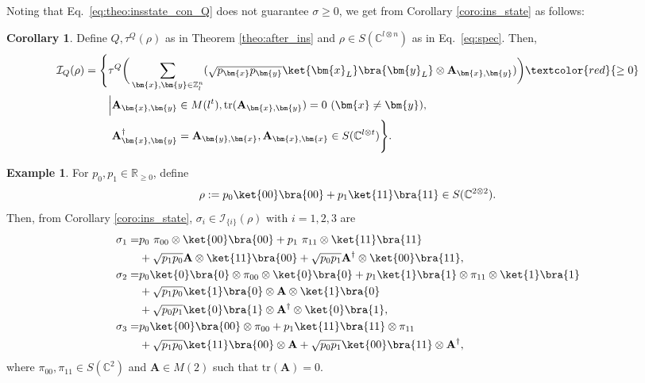 \documentclass[reprint,amsmath,amssymb,aps,]{revtex4-2}
\theoremstyle{definition}
\newtheorem{exam}{Example}
\newtheorem{coro}{Corollary}
\newcommand{\R}[1]{\textcolor{red}{#1}}
\newcommand{\SET}[1]{\mathbb{#1}}
\newcommand{\NNR}{\SET{R}_{\ge 0}}
\newcommand{\Z}{\SET{Z}}
\newcommand{\C}{\SET{C}}
\newcommand{\1}{\mbox{1}\hspace{-0.25em}\mbox{l}}%
\newcommand{\mat}[1]{\mathbf{#1}}
\newcommand{\pure}[2]{\C^{#1 \otimes #2}}
\newcommand{\state}[2]{S(\pure{#1}{#2})}
\newcommand{\QU}[1]{\mathcal{#1}}
\begin{document}
Noting that
Eq.~\eqref{eq:theo:insstate_con_Q} does not guarantee $\sigma \ge 0$,
we get from Corollary \ref{coro:ins_state} as follows:
\begin{coro}
  \label{coro:insset}
  Define $Q, \tau^Q(\rho)$ as in Theorem \ref{theo:after_ins}
  and
  $\rho \in \state{l}{n}$ as in Eq.~\eqref{eq:spec}.
  Then,
  \begin{align*}
    \QU{I}_Q(\rho)
    =
    \Bigg\{
    &\tau^Q
    \bigg(
    \sum_{\bm{x},\bm{y} \in \Z_{l}^{n}}
    (
    \sqrt{ p_{\bm{x}} p_{\bm{y}} }
    \ket{\bm{x}_L}\bra{\bm{y}_L} \otimes \mat{A}_{\bm{x},\bm{y}}
    )
    \bigg)
    \R{ \ge 0 }\\
    &\Big|
    \mat{A}_{\bm{x},\bm{y}} \in M(l^t),
    \text{tr}( \mat{A}_{\bm{x},\bm{y}} ) = 0 ~ (\bm{x} \neq \bm{y}),\\
    &~\mat{A}_{\bm{x},\bm{y}}^\dagger = \mat{A}_{\bm{y},\bm{x}},
    \mat{A}_{\bm{x},\bm{x}} \in \state{l}{t}
    \Bigg\}.
  \end{align*}
\end{coro}

\begin{exam}
  \label{exam:ins_set}
  For $p_0, p_1 \in \NNR$,
  define
  \begin{align*}
    \rho
    :=
    p_0\ket{00}\bra{00}
    +
    p_1\ket{11}\bra{11}
    \in
    \state{2}{2}.
  \end{align*}
  Then,
  from Corollary \ref{coro:ins_state},
  $\sigma_i \in \QU{I}_{\{i\}}(\rho)$ with $i=1,2,3$ are
  \begin{align*}
    \sigma_1
    =&
    p_0 ~ \pi_{00} \otimes \ket{00}\bra{00}
    +
    p_1 ~ \pi_{11} \otimes \ket{11}\bra{11}\\
    &+
    \sqrt{p_1 p_0} \mat{A} \otimes \ket{11}\bra{00}
    +
    \sqrt{p_0 p_1} \mat{A}^\dagger \otimes \ket{00}\bra{11},\\
    \sigma_2
    =&
    p_0 \ket{0}\bra{0} \otimes \pi_{00} \otimes \ket{0}\bra{0}
    +
    p_1 \ket{1}\bra{1} \otimes \pi_{11} \otimes \ket{1}\bra{1}\\
    &+
    \sqrt{p_1 p_0} \ket{1}\bra{0} \otimes \mat{A} \otimes \ket{1}\bra{0}\\
    &+
    \sqrt{p_0 p_1} \ket{0}\bra{1} \otimes \mat{A}^\dagger \otimes \ket{0}\bra{1},\\
    \sigma_3
    =&
    p_0 \ket{00}\bra{00} \otimes \pi_{00}
    +
    p_1 \ket{11}\bra{11} \otimes \pi_{11}\\
    &+
    \sqrt{p_1 p_0} \ket{11}\bra{00} \otimes \mat{A}
    +
    \sqrt{p_0 p_1} \ket{00}\bra{11} \otimes \mat{A}^\dagger,
  \end{align*}
  where
  $\pi_{00},\pi_{11} \in S(\C^2)$ and 
  $\mat{A} \in M(2)$ such that $\text{tr}(\mat{A}) = 0$.
\end{exam}
\end{document}
